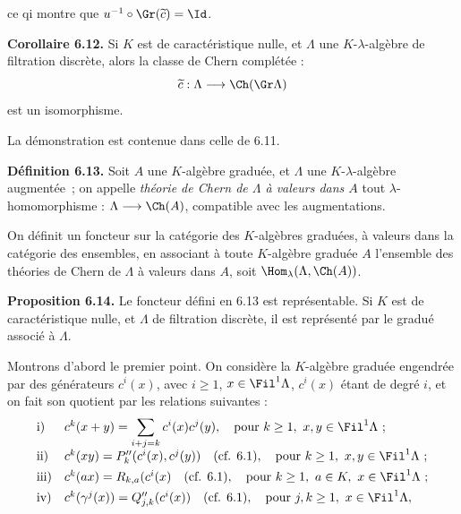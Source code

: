 ce q\hphantom{u}i
montre que \(u^{-1}\circ\Gr(\widetilde c)=\Id\).

\textbf{Corollaire 6.12.} Si \(K\) est de caractéristique nulle, et \(\Lambda\) une \(K\)-\(\lambda\)-algèbre de filtration discrète, alors la classe de Chern complétée :
\[
  \widetilde c:\Lambda\longrightarrow \Ch(\Gr\Lambda)
\]
est un isomorphisme.

La démonstration est contenue dans celle de 6.11.

\textbf{Définition 6.13.} Soit \(A\) une \(K\)-algèbre graduée, et \(\Lambda\) une \(K\)-\(\lambda\)-algèbre augmentée~; on appelle \emph{théorie de Chern de \(\Lambda\) à valeurs dans \(A\)} tout \(\lambda\)-homomorphisme : \(\Lambda\longrightarrow \Ch(A)\), compatible avec les augmentations.

On définit un foncteur sur la catégorie des \(K\)-algèbres graduées, à valeurs dans la catégorie des ensembles, en associant à toute \(K\)-algèbre graduée \(A\) l'ensemble des théories de Chern de \(\Lambda\) à valeurs dans \(A\), soit \(\Hom_\lambda(\Lambda,\Ch(A))\).

\textbf{Proposition 6.14.} Le foncteur défini en 6.13 est représentable. Si \(K\) est de caractéristique nulle, et \(\Lambda\) de filtration discrète, il est représenté par le gradué associé à \(\Lambda\).

Montrons d'abord le premier point. On considère la \(K\)-algèbre graduée engendrée par des générateurs \(c^i(x)\), avec \(i\ge1\), \(x\in\Fil^1\Lambda\), \(c^i(x)\) étant de degré \(i\), et on fait son quotient par les relations suivantes :
\[
\begin{array}{ll}
\text{i)}&
 c^k(x+y)=\displaystyle\sum_{i+j=k}c^i(x)c^j(y),
 \quad\text{pour } k\ge1,\ x,y\in\Fil^1\Lambda\ ;\\[0.8em]
\text{ii)}&
 c^k(xy)=P''_k(c^i(x),c^j(y))
 \quad(\text{cf. }6.1),
 \quad\text{pour } k\ge1,\ x,y\in\Fil^1\Lambda\ ;\\[0.4em]
\text{iii)}&
 c^k(ax)=R_{k,a}(c^i(x)
 \quad(\text{cf. }6.1),
 \quad\text{pour } k\ge1,\ a\in K,\ x\in\Fil^1\Lambda\ ;\\[0.4em]
\text{iv)}&
 c^k(\gamma^j(x))=Q''_{j,k}(c^i(x))
 \quad(\text{cf. }6.1),
 \quad\text{pour } j,k\ge1,\ x\in\Fil^1\Lambda,
\end{array}
\]

